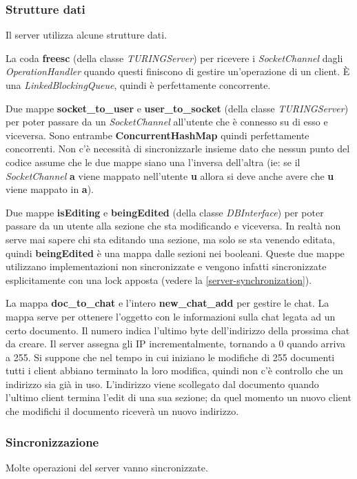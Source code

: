 \documentclass[a4paper]{article}
\theoremstyle{theorem}
\theoremstyle{remark}
\theoremstyle{definition}
\theoremstyle{corollary}
\theoremstyle{lemma}
\begin{document}
\subsubsection{Strutture dati}\label{server-data-structures}
Il server utilizza alcune strutture dati.

La coda \textbf{freesc} (della classe \textit{TURINGServer}) per ricevere i \textit{SocketChannel} dagli \textit{OperationHandler} quando questi finiscono di gestire un'operazione di un client. È una \textit{LinkedBlockingQueue}, quindi è perfettamente concorrente.

Due mappe \textbf{socket\_to\_user} e \textbf{user\_to\_socket} (della classe \textit{TURINGServer}) per poter passare da un \textit{SocketChannel} all'utente che è connesso su di esso e viceversa. Sono entrambe \textbf{ConcurrentHashMap} quindi perfettamente concorrenti. Non c'è necessità di sincronizzarle insieme dato che nessun punto del codice assume che le due mappe siano una l'inversa dell'altra (ie: se il \textit{SocketChannel} \textbf{a} viene mappato nell'utente \textbf{u} allora si deve anche avere che \textbf{u} viene mappato in \textbf{a}).

Due mappe \textbf{isEditing} e \textbf{beingEdited} (della classe \textit{DBInterface}) per poter passare da un utente alla sezione che sta modificando e viceversa. In realtà non serve mai sapere chi sta editando una sezione, ma solo se sta venendo editata, quindi \textbf{beingEdited} è una mappa dalle sezioni nei booleani. Queste due mappe utilizzano implementazioni non sincronizzate e vengono infatti sincronizzate esplicitamente con una lock apposta (vedere la \autoref{server-synchronization}).

La mappa \textbf{doc\_to\_chat} e l'intero \textbf{new\_chat\_add} per gestire le chat. La mappa serve per ottenere l'oggetto con le informazioni sulla chat legata ad un certo documento. Il numero indica l'ultimo byte dell'indirizzo della prossima chat da creare. Il server assegna gli IP incrementalmente, tornando a 0 quando arriva a 255. Si suppone che nel tempo in cui iniziano le modifiche di 255 documenti tutti i client abbiano terminato la loro modifica, quindi non c'è controllo che un indirizzo sia già in uso. L'indirizzo viene scollegato dal documento quando l'ultimo client termina l'edit di una sua sezione; da quel momento un nuovo client che modifichi il documento riceverà un nuovo indirizzo.

\subsubsection{Sincronizzazione}\label{server-synchronization}
Molte operazioni del server vanno sincronizzate.
\end{document}
